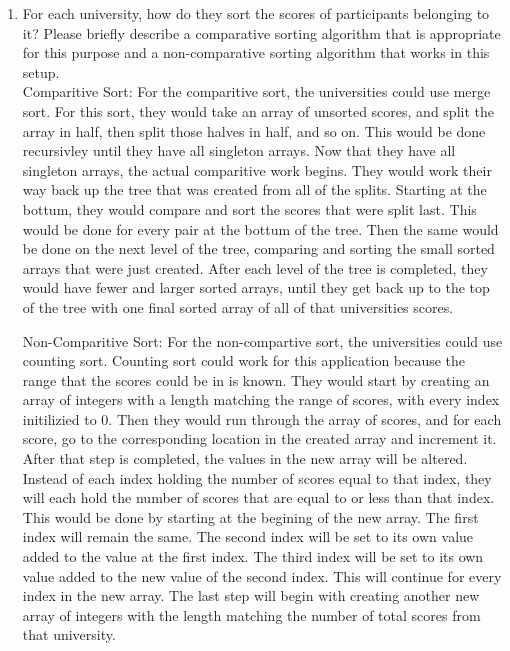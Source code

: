 \documentclass{article}
\begin{document}
\begin{enumerate}

\item For each university, how do they sort the scores of participants
  belonging to it? Please briefly describe a comparative sorting
  algorithm that is appropriate for this purpose and a non-comparative
  sorting algorithm that works in this setup.\\

Comparitive Sort:  For the comparitive sort, the universities could use merge sort.  For this sort, they would take an array of
unsorted scores, and split the array in half, then split those halves in half, and so on.  This would be done recursivley until they have all singleton 
arrays.  Now that they have all singleton arrays, the actual comparitive work begins.  They would work their way back up the tree that was created from all of the splits.  Starting at the bottum, they would compare and sort the scores that were split last.  This would be done for every pair at the  bottum of the tree.  Then the same would be done on the next level of the tree, comparing and sorting the small sorted arrays that were just created.  After each level of the tree is completed, they would have fewer and larger sorted arrays, until they get back up to the top of the tree with one final sorted array of all of that universities scores.

Non-Comparitive Sort:  For the non-compartive sort, the universities could use counting sort.  Counting sort could work for this application because 
the range that the scores could be in is known.  They would start by creating an array of integers with a length matching the range of scores, with every index initilizied to 0. Then they would run through the array of scores, and for each score, go to the corresponding location in the created array and increment it.  After that step is completed, the values in the new array will be altered.  Instead of each index holding the number of scores equal to that index, they will each hold the number of scores that are equal to or less than that index.  This would be done by starting at the begining of the new array.  The first index will remain the same.  The second index will be set to its own value added to the value at the first index.  The third index will be set to its own value added to the new value of the second index.  This will continue for every index in the new array.  The last step will begin with creating another new array of integers with the length matching the number of total scores from that university.  


\end{enumerate}
\end{document}
